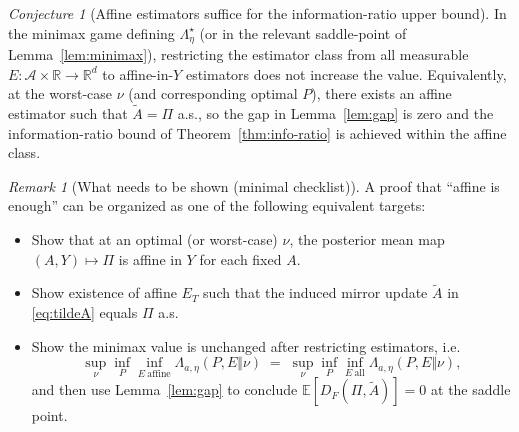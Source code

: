 \documentclass[11pt]{article}
\newcommand{\R}{\mathbb{R}}
\newcommand{\Rd}{\mathbb{R}^d}
\newcommand{\E}{\mathbb{E}}
\newcommand{\cA}{\mathcal{A}}
\newcommand{\po}{\Pi}           %
\theoremstyle{definition}
\theoremstyle{plain}
\theoremstyle{remark}
\newtheorem{remark}{Remark}
\newtheorem{conjecture}{Conjecture}
\begin{document}
\begin{conjecture}[Affine estimators suffice for the information-ratio upper bound]
    In the minimax game defining $\Lambda^\star_\eta$ (or in the relevant saddle-point of Lemma~\ref{lem:minimax}),
    restricting the estimator class from all measurable $E:\cA\times\R\to\Rd$ to affine-in-$Y$ estimators does not increase the value.
    Equivalently, at the worst-case $\nu$ (and corresponding optimal $P$), there exists an affine estimator such that $\tilde A=\po$ a.s.,
    so the gap in Lemma~\ref{lem:gap} is zero and the information-ratio bound of Theorem~\ref{thm:info-ratio} is achieved within the affine class.
\end{conjecture}

\begin{remark}[What needs to be shown (minimal checklist)]
    A proof that ``affine is enough'' can be organized as one of the following equivalent targets:
    \begin{itemize}
        \item Show that at an optimal (or worst-case) $\nu$, the posterior mean map $(A,Y)\mapsto \po$ is affine in $Y$ for each fixed $A$.
        \item Show existence of affine $E_T$ such that the induced mirror update $\tilde A$ in \eqref{eq:tildeA} equals $\po$ a.s.
        \item Show the minimax value is unchanged after restricting estimators, i.e.
              \[
                  \sup_{\nu}\inf_{P}\inf_{E\ \mathrm{affine}}\Lambda_{a,\eta}(P,E\Vert\nu)
                  \;=\;
                  \sup_{\nu}\inf_{P}\inf_{E\ \mathrm{all}}\Lambda_{a,\eta}(P,E\Vert\nu),
              \]
              and then use Lemma~\ref{lem:gap} to conclude $\E[D_F(\po,\tilde A)]=0$ at the saddle point.
    \end{itemize}
\end{remark}
\end{document}
